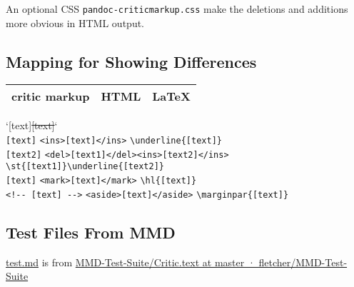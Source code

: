 \documentclass[]{article}
\begin{document}
An optional CSS \texttt{pandoc-criticmarkup.css} make the deletions and
additions more obvious in HTML output.

\subsection{Mapping for Showing
Differences}\label{mapping-for-showing-differences}

\begin{longtable}[]{@{}lll@{}}
\toprule
critic markup & HTML & LaTeX\tabularnewline
\midrule
\endhead
\bottomrule
\end{longtable}

`\texttt{\textbar{}}{[}text{]}\texttt{\textbar{}}\st{[text]}`
\textbar{}\\
\texttt{{[}text{]}} \textbar{}
\texttt{\textless{}ins\textgreater{}{[}text{]}\textless{}/ins\textgreater{}}
\textbar{} \texttt{\textbackslash{}underline\{{[}text{]}\}} \textbar{}\\
\texttt{{[}text2{]}} \textbar{}
\texttt{\textless{}del\textgreater{}{[}text1{]}\textless{}/del\textgreater{}\textless{}ins\textgreater{}{[}text2{]}\textless{}/ins\textgreater{}}
\textbar{}
\texttt{\textbackslash{}st\{{[}text1{]}\}\textbackslash{}underline\{{[}text2{]}\}}
\textbar{}\\
\texttt{{[}text{]}} \textbar{}
\texttt{\textless{}mark\textgreater{}{[}text{]}\textless{}/mark\textgreater{}}
\textbar{} \texttt{\textbackslash{}hl\{{[}text{]}\}} \textbar{}\\
\texttt{\textless{}!-\/-\ {[}text{]}\ -\/-\textgreater{}} \textbar{}
\texttt{\textless{}aside\textgreater{}{[}text{]}\textless{}/aside\textgreater{}}
\textbar{} \texttt{\textbackslash{}marginpar\{{[}text{]}\}} \textbar{}

\subsection{Test Files From MMD}\label{test-files-from-mmd}

\url{test.md} is from
\href{https://github.com/fletcher/MMD-Test-Suite/blob/master/CriticMarkup/Critic.text}{MMD-Test-Suite/Critic.text
at master · fletcher/MMD-Test-Suite}
\end{document}

